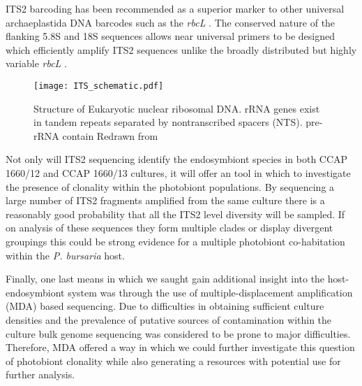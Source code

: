 ITS2 barcoding has been recommended as a superior marker to 
other universal archaeplastida DNA barcodes such as the \textit{rbcL} 
\citep{Chen2010}.  The conserved nature of the flanking 5.8S and
18S sequences allows near universal primers to be designed which efficiently 
amplify ITS2 sequences unlike the broadly distributed but
highly variable \textit{rbcL} \citep{Buchheim2011}.

\begin{figure}[h]
    \texttt{[image: ITS\_schematic.pdf]}
    \caption{Structure of Eukaryotic nuclear ribosomal DNA.
        rRNA genes exist in tandem repeats separated by nontranscribed spacers (NTS).
        pre-rRNA contain 
    Redrawn from \citep{Shi2005}}
\label{fig;its2_schematic}
\end{figure}

Not only will ITS2 sequencing identify the endosymbiont species in
both CCAP 1660/12 and CCAP 1660/13 cultures, it will offer an
tool in which to investigate the presence of clonality within the
photobiont populations.  By sequencing a large number of 
ITS2 fragments amplified from the same culture there is a reasonably
good probability that all the ITS2 level diversity will be sampled. 
If on analysis of these sequences they form multiple clades or 
display divergent groupings this could be strong evidence
for a multiple photobiont co-habitation within the \textit{P. bursaria}
host. 


Finally, one last means in which we saught 
gain additional insight into the host-endosymbiont
system was through the use of multiple-displacement amplification (MDA)
based sequencing. Due to difficulties in obtaining sufficient
culture densities and the prevalence of putative sources of contamination
within the culture bulk genome sequencing was considered to be prone to 
major difficulties.  Therefore, MDA offered a way in which 
we could further investigate this question of photobiont clonality
while also generating a resources with potential use for further analysis.



%
%
%


